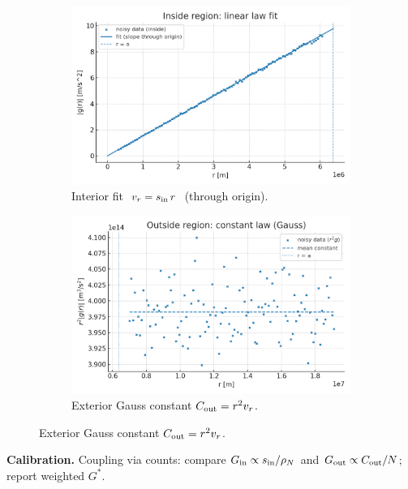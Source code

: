\documentclass[12pt,a4paper,oneside]{scrreprt}
\begin{document}
\begin{figure}[htbp]
  \vspace{0.6em}
  \begin{subfigure}[t]{0.49\linewidth}
    \includegraphics[width=\linewidth]{gravity_inside_fit.png}
    \caption{Interior fit $\;v_r=s_{\rm in}\,r\;$ (through origin).}
    \label{fig:grav:inside}
  \end{subfigure}\hfill
  \begin{subfigure}[t]{0.49\linewidth}
    \includegraphics[width=\linewidth]{gravity_outside_constant.png}
    \caption{Exterior Gauss constant $C_{\rm out}=r^2 v_r$.}
    \label{fig:grav:cout}
  \end{subfigure}
\end{figure}

\noindent\textbf{Calibration.} Coupling via counts: compare $G_{\rm in}\propto s_{\rm in}/\rho_N$ and $G_{\rm out}\propto C_{\rm out}/N$; report weighted $G^*$.
\end{document}
